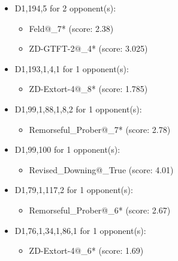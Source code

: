 \begin{appendices}
\begin{itemize}
    \item D1,194,5 for 2 opponent(s):
    \begin{multicols}{3}
         \begin{itemize}
            \item Feld@\_7* (score: 2.38)
            \item ZD-GTFT-2@\_4* (score: 3.025)
        \end{itemize}
     \end{multicols}
     
    \item D1,193,1,4,1 for 1 opponent(s):
    \begin{multicols}{3}
         \begin{itemize}
            \item ZD-Extort-4@\_8* (score: 1.785)
        \end{itemize}
     \end{multicols}
     
    \item D1,99,1,88,1,8,2 for 1 opponent(s):
    \begin{multicols}{3}
         \begin{itemize}
            \item Remorseful\_Prober@\_7* (score: 2.78)
        \end{itemize}
     \end{multicols}
     
    \item D1,99,100 for 1 opponent(s):
    \begin{multicols}{3}
         \begin{itemize}
            \item Revised\_Downing@\_True (score: 4.01)
        \end{itemize}
     \end{multicols}
     
    \item D1,79,1,117,2 for 1 opponent(s):
    \begin{multicols}{3}
         \begin{itemize}
            \item Remorseful\_Prober@\_6* (score: 2.67)
        \end{itemize}
     \end{multicols}
     
    \item D1,76,1,34,1,86,1 for 1 opponent(s):
    \begin{multicols}{3}
         \begin{itemize}
            \item ZD-Extort-4@\_6* (score: 1.69)
        \end{itemize}
     \end{multicols}
     

\end{itemize}
\end{appendices}
